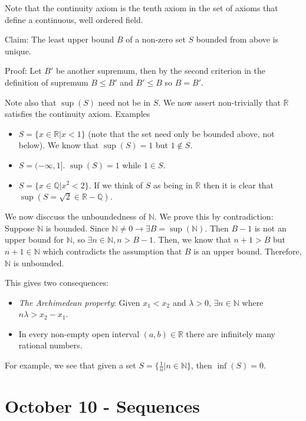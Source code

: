 \documentclass{report}
\begin{document}
Note that the continuity axiom is the tenth axiom in the set of axioms that define a continuous, well ordered field.

Claim: The least upper bound $B$ of a non-zero set $S$ bounded from above is unique. 

Proof: Let $B'$ be another supremum, then by the second criterion in the definition of supremum $B \leq B'$ and $B' \leq B$ so $B = B'$. 

Note also that $\sup(S)$ need not be in $S$. We now assert non-trivially that $\mathbb{R}$ satisfies the continuity axiom. Examples

\begin{itemize}
\item $S = \{x \in \mathbb{R} | x < 1\}$ (note that the set need only be bounded above, not below). We know that $\sup(S) = 1$ but $1 \notin S$. 
\item $S = (- \infty, 1]$. $\sup(S) = 1$ while $1 \in S$. 
\item $S = \{x \in \mathbb{Q} | x^2 < 2\}$. If we think of $S$ as being in $\mathbb{R}$ then it is clear that $\sup(S = \sqrt{2} \in \mathbb{R} - \mathbb{Q})$.
\end{itemize}

We now disccuss the unboundedness of $\mathbb{N}$. We prove this by contradiction: Suppose $\mathbb{N}$ is bounded. Since $\mathbb{N} \neq 0 \rightarrow \exists B = \sup(\mathbb{N})$. Then $B - 1$ is not an upper bound for $\mathbb{N}$, so $\exists n \in \mathbb{N}, n > B-1$. Then, we know that $n+1 > B$ but $n+1 \in \mathbb{N}$ which contradicts the assumption that $B$ is an upper bound. Therefore, $\mathbb{N}$ is unbounded. 

This gives two consequences:

\begin{itemize}
\item \emph{The Archimedean property}: Given $x_1 < x_2$ and $\lambda > 0$, $\exists n \in \mathbb{N}$ where $n\lambda > x_2 - x_1$.
\item In every non-empty open interval $(a,b) \in \mathbb{R}$ there are infinitely many rational numbers. 
\end{itemize}

For example, we see that given a set $S = \{\frac{1}{n} | n \in \mathbb{N}\}$, then $\inf(S) = 0$.

\chapter{October 10 - Sequences}
\end{document}
